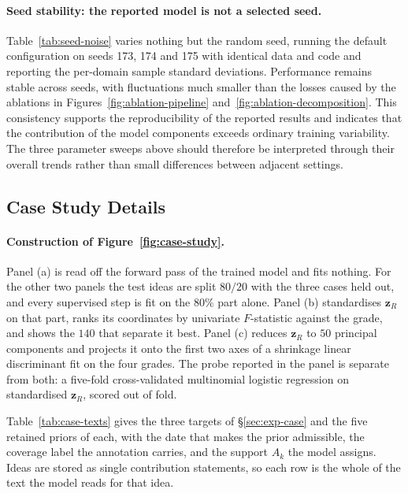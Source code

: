 \paragraph{Seed stability: the reported model is not a selected seed.}
Table~\ref{tab:seed-noise} varies nothing but the random seed, running the
default configuration on seeds 173, 174 and 175 with identical data and code and
reporting the per-domain sample standard deviations. Performance remains
stable across seeds, with fluctuations much smaller than the losses caused by
the ablations in Figures~\ref{fig:ablation-pipeline}
and~\ref{fig:ablation-decomposition}. This consistency supports the
reproducibility of the reported results and indicates that the contribution of
the model components exceeds ordinary training variability. The three parameter
sweeps above should therefore be interpreted through their overall trends
rather than small differences between adjacent settings.

\subsection{Case Study Details}
\label{app:case-study}

\paragraph{Construction of Figure~\ref{fig:case-study}.}
Panel (a) is read off the forward pass of the trained model and fits nothing.
For the other two panels the test ideas are split $80/20$ with the three cases
held out, and every supervised step is fit on the $80\%$ part alone. Panel (b)
standardises $\boldsymbol{z}_R$ on that part, ranks its coordinates by
univariate $F$-statistic against the grade, and shows the $140$ that separate it
best. Panel (c) reduces $\boldsymbol{z}_R$ to $50$ principal components and
projects it onto the first two axes of a shrinkage linear discriminant fit on
the four grades. The probe reported in the panel is separate from both: a
five-fold cross-validated multinomial logistic regression on standardised
$\boldsymbol{z}_R$, scored out of fold.

Table~\ref{tab:case-texts} gives the three
targets of \S\ref{sec:exp-case} and the five retained priors of each, with the
date that makes the prior admissible, the coverage label the annotation carries,
and the support $A_k$ the model assigns. Ideas are stored as single contribution
statements, so each row is the whole of the text the model reads for that idea.


